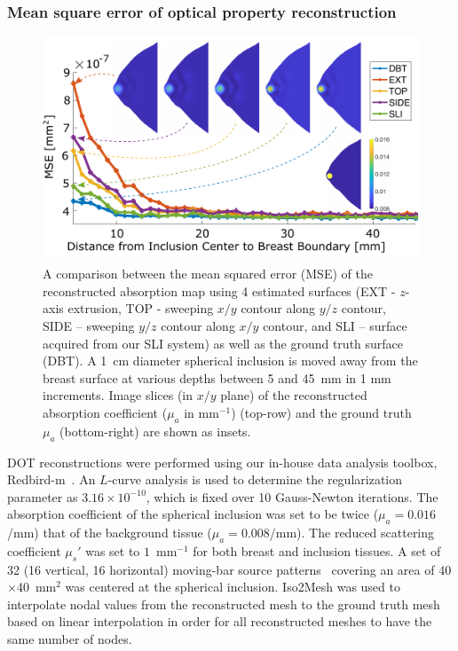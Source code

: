 \subsubsection{Mean square error of optical property reconstruction}
\begin{figure}
	\begin{center}
	    \includegraphics[width=.9\textwidth]{fig/omci/mse.pdf}
	\end{center}
	\caption{A comparison between the mean squared error (MSE) of the reconstructed absorption map using 4 estimated surfaces (EXT - $z$-axis extrusion, TOP - sweeping $x/y$ contour along $y/z$ contour, SIDE -- sweeping $y/z$ contour along $x/y$ contour, and SLI -- surface acquired from our SLI system) as well as the ground truth surface (DBT). A 1~cm diameter spherical inclusion is moved away from the breast surface at various depths between 5 and 45~mm in 1 mm increments. Image slices (in $x/y$ plane) of the reconstructed absorption coefficient ($\mu_a$ in mm$^{-1}$) (top-row) and the ground truth $\mu_a$ (bottom-right) are shown as insets.}
	\label{fig:mse}
\end{figure} 

DOT reconstructions were performed using our in-house data analysis toolbox, Redbird-m~\cite{Redbird2008}. An $L$-curve analysis is used to determine the regularization parameter as $3.16\times 10^{-10}$, which is fixed over 10 Gauss-Newton iterations. The absorption coefficient of the spherical inclusion was set to be twice ($\mu_a=0.016$/mm) that of the background tissue ($\mu_a=0.008$/mm). The reduced scattering coefficient $\mu_s'$ was set to $1$~mm$^{-1}$ for both breast and inclusion tissues. A set of 32 (16 vertical, 16 horizontal) moving-bar source patterns~\cite{Yao2015} covering an area of 40$\times$40~mm$^2$ was centered at the spherical inclusion. Iso2Mesh was used to interpolate nodal values from the reconstructed mesh to the ground truth mesh based on linear interpolation in order for all reconstructed meshes to have the same number of nodes.

